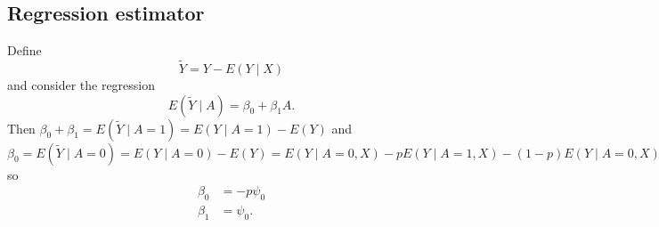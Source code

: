 \documentclass[10pt,a4paper]{amsart}
\newcommand{\EE}{E}
\newcommand{\E}[1]{\EE(Y\mid A=#1,X)}
\begin{document}


\subsection{Regression estimator}

Define
\[
  \tilde{Y} = Y - \EE(Y\mid X)
\]
and consider the regression
\[
  \EE(\tilde{Y} \mid A) = \beta_0 + \beta_1A.
\]
Then $\beta_0 + \beta_1 = \EE(\tilde{Y}\mid A=1) = \EE(Y\mid A=1) -
E(Y)$ and $\beta_0 = \EE(\tilde{Y}\mid A=0) = \EE(Y\mid A=0) -
E(Y) = \E0-p\E1-(1-p)\E0 = p(\E0-\E1),$ so
\begin{align*}
  \beta_0 &= -p\psi_0\\
  \beta_1 &= \psi_0.
\end{align*}
\end{document}
